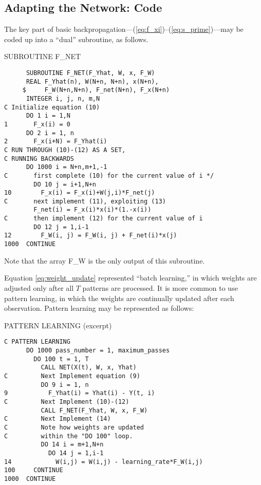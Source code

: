 \documentclass[journal]{IEEEtran} %
\begin{document}
\subsection{Adapting the Network: Code}
The key part of basic backpropagation---(\ref{eq:f_xi})--(\ref{eq:s_prime})---may be coded up into a ``dual'' subroutine, as follows.
\begin{fortrancode}
\caption{SUBROUTINE F\_NET}
\begin{verbatim}
      SUBROUTINE F_NET(F_Yhat, W, x, F_W)
      REAL F_Yhat(n), W(N+n, N+n), x(N+n),
     $     F_W(N+n,N+n), F_net(N+n), F_x(N+n)
      INTEGER i, j, n, m,N
C Initialize equation (10)
      DO 1 i = 1,N
1       F_x(i) = 0
      DO 2 i = 1, n
2       F_x(i+N) = F_Yhat(i)
C RUN THROUGH (10)-(12) AS A SET,
C RUNNING BACKWARDS
      DO 1000 i = N+n,m+1,-1
C       first complete (10) for the current value of i */
        DO 10 j = i+1,N+n
10        F_x(i) = F_x(i)+W(j,i)*F_net(j)
C       next implement (11), exploiting (13)
        F_net(i) = F_x(i)*x(i)*(1.-x(i))
C       then implement (12) for the current value of i
        DO 12 j = 1,i-1
12        F_W(i, j) = F_W(i, j) + F_net(i)*x(j)
1000  CONTINUE
\end{verbatim}
\end{fortrancode}

Note that the array F\_W is the only output of this subroutine.

Equation \eqref{eq:weight_update} represented ``batch learning,'' in which weights are adjusted only after all $T$ patterns are processed. It is more common to use pattern learning, in which the weights are continually updated after each observation. Pattern learning may be represented as follows:

\begin{fortrancode}
\caption{PATTERN LEARNING (excerpt)}
\begin{verbatim}
C PATTERN LEARNING
      DO 1000 pass_number = 1, maximum_passes
        DO 100 t = 1, T
          CALL NET(X(t), W, x, Yhat)
C         Next Implement equation (9)
          DO 9 i = 1, n
9           F_Yhat(i) = Yhat(i) - Y(t, i)
C         Next Implement (10)-(12)
          CALL F_NET(F_Yhat, W, x, F_W)
C         Next Implement (14)
C         Note how weights are updated
C         within the "DO 100" loop.
          DO 14 i = m+1,N+n
            DO 14 j = 1,i-1
14            W(i,j) = W(i,j) - learning_rate*F_W(i,j)
100     CONTINUE
1000  CONTINUE
\end{verbatim}
\end{fortrancode}
\end{document}
